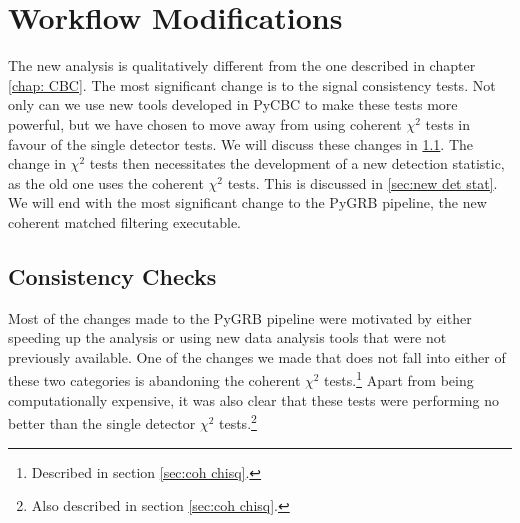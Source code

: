 \documentclass[11pt]{cuthesis}
\begin{document}
\section{Workflow Modifications} \label{sec:pygrb changes}
The new analysis is qualitatively different from the one described in chapter \ref{chap: CBC}. The most significant change is to the signal consistency tests. Not only can we use new tools developed in PyCBC to make these tests more powerful, but we have chosen to move away from using coherent $\chi^2$ tests in favour of the single detector tests. We will discuss these changes in \ref{sec:new chisq}. The change in $\chi^2$ tests then necessitates the development of a new detection statistic, as the old one uses the coherent $\chi^2$ tests. This is discussed in \ref{sec:new det stat}. We will end with the most significant change to the PyGRB pipeline, the new coherent matched filtering executable.

\subsection{Consistency Checks} \label{sec:new chisq}
Most of the changes made to the PyGRB pipeline were motivated by either speeding up the analysis or using new data analysis tools that were not previously available. One of the changes we made that does not fall into either of these two categories is abandoning the coherent $\chi^2$ tests.\footnote{Described in section \ref{sec:coh chisq}.} Apart from being computationally expensive, it was also clear that these tests were performing no better than the single detector $\chi^2$ tests.\footnote{Also described in section \ref{sec:coh chisq}.} 
\end{document}
